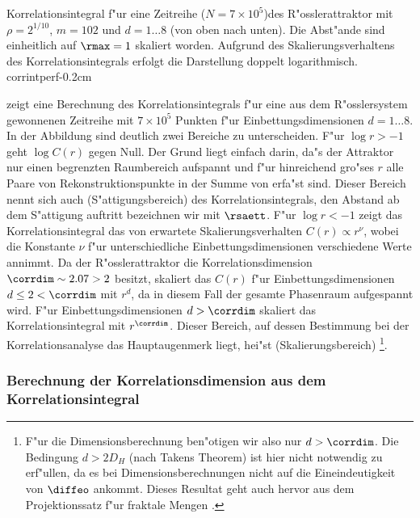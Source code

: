 {Korrelationsintegral f"ur eine Zeitreihe ($N=7\times 10^5$)des R"osslerattraktor mit $\rho=2^{1/10}$,
$m=102$ und $d=1\dots 8$ (von oben nach unten). Die Abst"ande sind einheitlich auf
$\rmax=1$ skaliert worden. Aufgrund des Skalierungsverhaltens des
Korrelationsintegrals erfolgt die Darstellung doppelt logarithmisch.} 
{corrintperf}{-0.2cm}

 zeigt eine Berechnung des Korrelationsintegrals f"ur eine aus dem
R"osslersystem \cite{Roessler76} gewonnenen Zeitreihe mit $7\times 10^5$ Punkten 
f"ur Einbettungsdimensionen $d=1\dots 8$. In der Abbildung sind deutlich zwei Bereiche zu
unterscheiden. F"ur $\log r>-1$ geht $\log C(r)$ gegen Null. Der Grund liegt einfach
darin, da"s der Attraktor nur einen begrenzten Raumbereich aufspannt und f"ur hinreichend
gro"ses $r$ alle Paare von Rekonstruktionspunkte  in der Summe von 
erfa"st sind. Dieser Bereich nennt sich auch \begriff(S"attigungsbereich) des
Korrelationsintegrals, den Abstand ab dem S"attigung auftritt bezeichnen wir mit
$\rsaett$. F"ur $\log r<-1$ zeigt das Korrelationsintegral das von
 erwartete Skalierungsverhalten $C(r)\propto r^\nu$, wobei die Konstante
$\nu$ f"ur unterschiedliche Einbettungsdimensionen verschiedene Werte annimmt. Da der
R"osslerattraktor die Korrelationsdimension $\corrdim\sim 2.07>2$ besitzt, skaliert das $C(r)$
f"ur Einbettungsdimensionen $d\leq 2<\corrdim$ mit $r^d$, da in diesem Fall der gesamte Phasenraum
aufgespannt wird. F"ur Einbettungsdimensionen $d>\corrdim$ skaliert das Korrelationsintegral
mit $r^{\corrdim}$. Dieser Bereich, auf dessen Bestimmung bei der Korrelationsanalyse das
Hauptaugenmerk liegt, hei"st \begriff(Skalierungsbereich)
\footnote{F"ur die Dimensionsberechnung ben"otigen wir also nur $d>\corrdim$. Die Bedingung
$d>2D_H$ (nach Takens Theorem) ist hier nicht notwendig zu erf"ullen, da es bei
Dimensionsberechnungen nicht auf die Eineindeutigkeit von $\diffeo$ ankommt. Dieses Resultat geht
auch hervor aus dem Projektionssatz f"ur fraktale Mengen \cite{Falconer93}.}.

\subsubsection{Berechnung der Korrelationsdimension aus dem Korrelationsintegral}
